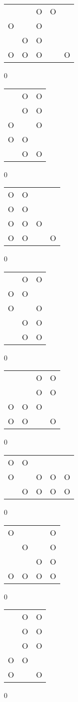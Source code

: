 \begin{tabular}{|m{0.2cm}m{0.2cm}m{0.2cm}m{0.2cm}m{0.2cm}|}\hline
 & &O&O& \\
O& &O& & \\
 &O&O& & \\
O&O&O& &O\\
\hline\end{tabular}0
\begin{tabular}{|m{0.2cm}m{0.2cm}m{0.2cm}|}\hline
 &O&O\\
 &O&O\\
O& &O\\
O&O& \\
 &O&O\\
\hline\end{tabular}0
\begin{tabular}{|m{0.2cm}m{0.2cm}m{0.2cm}m{0.2cm}|}\hline
O&O& & \\
O&O& & \\
O&O&O& \\
O&O& &O\\
\hline\end{tabular}0
\begin{tabular}{|m{0.2cm}m{0.2cm}m{0.2cm}|}\hline
 &O&O\\
O&O& \\
O& &O\\
 &O&O\\
 &O&O\\
\hline\end{tabular}0
\begin{tabular}{|m{0.2cm}m{0.2cm}m{0.2cm}m{0.2cm}|}\hline
 & &O&O\\
 & &O&O\\
O&O&O& \\
O&O& &O\\
\hline\end{tabular}0
\begin{tabular}{|m{0.2cm}m{0.2cm}m{0.2cm}m{0.2cm}m{0.2cm}|}\hline
O&O& & & \\
O& &O&O&O\\
 &O&O&O&O\\
\hline\end{tabular}0
\begin{tabular}{|m{0.2cm}m{0.2cm}m{0.2cm}m{0.2cm}|}\hline
O& & &O\\
 &O& &O\\
 & &O&O\\
O&O&O&O\\
\hline\end{tabular}0
\begin{tabular}{|m{0.2cm}m{0.2cm}m{0.2cm}|}\hline
 &O&O\\
 &O&O\\
 &O&O\\
O&O& \\
O& &O\\
\hline\end{tabular}0
